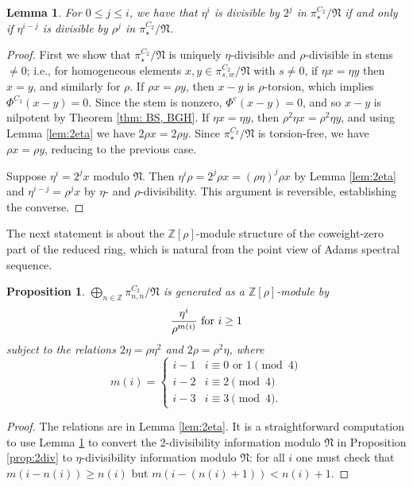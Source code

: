 \documentclass[psamsfonts]{amsart}
\newcommand{\Z}{\mathbb Z}
\newcommand{\fN}{\mathfrak N}
\newtheorem{proposition}[theorem]{Proposition}
\newtheorem{lemma}[theorem]{Lemma}
\theoremstyle{definition}
\theoremstyle{remark}
\numberwithin{equation}{section}
\begin{document}
\begin{lemma}\label{lem:2-to-eta}
For $0\leq j\leq i$,
we have that $\eta^i$ is divisible by $2^j$ in $\pi_\star^{C_2}/\fN$ if and only if
$\eta^{i-j}$ is divisible by $\rho^j$ in $\pi_\star^{C_2}/\fN$.
\end{lemma}
\begin{proof}
First we show that $\pi_\star^{C_2}/\fN$ is uniquely $\eta$-divisible and
$\rho$-divisible in stems $\neq 0$; i.e., for homogeneous elements $x,y\in
\pi_{s,w}^{C_2}/\fN$ with $s\neq 0$,
if $\eta x = \eta y$ then $x = y$, and similarly for $\rho$.
If $\rho x = \rho y$, then $x-y$ is $\rho$-torsion, which implies
$\Phi^{C_2}(x-y)=0$. Since the stem is nonzero, $\Phi^e(x-y)=0$, and so $x-y$ is
nilpotent by Theorem \ref{thm: BS, BGH}.
If $\eta x = \eta y$, then $\rho^2 \eta x = \rho^2 \eta y$, and using Lemma
\ref{lem:2eta} we have $2\rho x = 2\rho y$. Since $\pi_\star^{C_2}/\fN$ is
torsion-free, we have $\rho x = \rho y$, reducing to the previous case.

Suppose $\eta^i = 2^j x$ modulo $\fN$. Then $\eta^i \rho = 2^j \rho x = (\rho
\eta)^j \rho x$ by Lemma \ref{lem:2eta} and $\eta^{i-j} = \rho^j x$ by $\eta$-
and $\rho$-divisibility. This argument is reversible, establishing the converse.
\end{proof}

The next statement is about the $\Z[\rho]$-module structure of the coweight-zero part of the reduced ring, which is natural from the point view of Adams spectral sequence.

\begin{proposition}\label{prop:nn}
$\bigoplus_{n\in \Z}\pi^{C_2}_{n,n}/\fN$ is generated as a $\Z[\rho]$-module by
$$ {\eta^i\over \rho^{m(i)}}\text{ for }i\geq 1$$
subject to the relations $2\eta = \rho \eta^2$ and $2\rho = \rho^2 \eta$, where
   \[
	  m(i) = \begin{cases} 
	  i-1 & i \equiv 0\text{ or }1 \pmod 4
	  \\i-2 & i\equiv 2\pmod 4
	  \\i-3 & i\equiv 3\pmod 4.
	  \end{cases}
   \]
\end{proposition}
\begin{proof}
The relations are in Lemma \ref{lem:2eta}. 
It is a straightforward computation to use Lemma \ref{lem:2-to-eta} to convert
the 2-divisibility information modulo $\fN$ in Proposition \ref{prop:2div} to
$\eta$-divisibility information modulo $\fN$: for all $i$ one must check that
$m(i-n(i))\geq n(i)$ but $m(i-(n(i)+1)) < n(i)+1$.
\end{proof}
\end{document}
